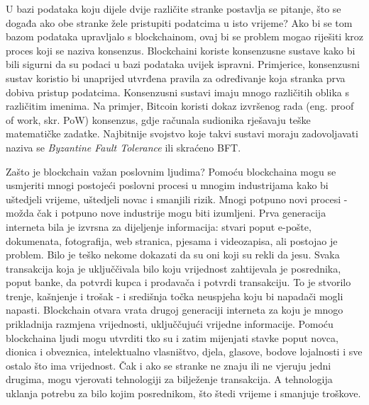 \documentclass[times, utf8, diplomski]{fer}
\begin{document}
U bazi podataka koju dijele dvije različite stranke postavlja se pitanje, što se događa ako obe stranke žele pristupiti podatcima u isto vrijeme? Ako bi se tom bazom podataka upravljalo s blockchainom, ovaj bi se problem mogao riješiti kroz proces koji se naziva konsenzus. Blockchaini koriste konsenzusne sustave kako bi bili sigurni da su podaci u bazi podataka uvijek ispravni. Primjerice, konsenzusni sustav koristio bi unaprijed utvrđena pravila za određivanje koja stranka prva dobiva pristup podatcima. Konsenzusni sustavi imaju mnogo različitih oblika s različitim imenima. Na primjer, Bitcoin koristi dokaz izvršenog rada (eng. proof of work, skr. PoW) konsenzus, gdje računala sudionika rješavaju teške matematičke zadatke. Najbitnije svojstvo koje takvi sustavi moraju zadovoljavati naziva se \textit{Byzantine Fault Tolerance} ili skraćeno BFT. 

Zašto je blockchain važan poslovnim ljudima? Pomoću blockchaina mogu se usmjeriti mnogi postojeći poslovni procesi u mnogim industrijama kako bi uštedjeli vrijeme, uštedjeli novac i smanjili rizik. Mnogi potpuno novi procesi - možda čak i potpuno nove industrije mogu biti izumljeni. Prva generacija interneta bila je izvrsna za dijeljenje informacija: stvari poput e-pošte, dokumenata, fotografija, web stranica, pjesama i videozapisa, ali postojao je problem. Bilo je teško nekome dokazati da su oni koji su rekli da jesu. Svaka transakcija koja je uključčivala bilo koju vrijednost zahtijevala je posrednika, poput banke, da potvrdi kupca i prodavača i potvrdi transakciju. To je stvorilo trenje, kašnjenje i trošak - i središnja točka neuspjeha koju bi napadači mogli napasti. Blockchain otvara vrata drugoj generaciji interneta za koju je mnogo prikladnija razmjena vrijednosti, uključčujući vrijedne informacije. Pomoću blockchaina ljudi mogu utvrditi tko su i zatim mijenjati stavke poput novca, dionica i obveznica, intelektualno vlasništvo, djela, glasove, bodove lojalnosti i sve ostalo što ima vrijednost. Čak i ako se stranke ne znaju ili ne vjeruju jedni drugima, mogu vjerovati tehnologiji za bilježenje transakcija. A tehnologija uklanja potrebu za bilo kojim posrednikom, što štedi vrijeme i smanjuje troškove.
\end{document}
